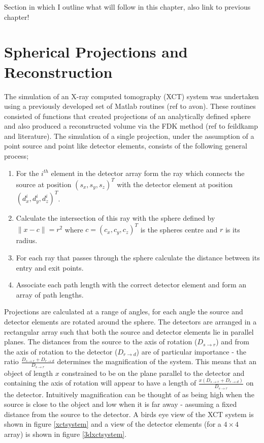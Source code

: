 \documentclass[
  twoside,
  11pt, a4paper,
  footinclude=true,
  headinclude=true,
  cleardoublepage=empty
]{scrbook}
\begin{document}
Section in which I outline what will follow in this chapter, also link to previous chapter!

\section{Spherical Projections and Reconstruction}

The simulation of an X-ray computed tomography (XCT) system was undertaken using a previously developed set of Matlab routines (ref to avon). These routines consisted of functions that created projections of an analytically defined sphere and also produced a reconstructed volume via the FDK method (ref to feildkamp and literature). The simulation of a single projection, under the assumption of a point source and point like detector elements, consists of the following general process;

\begin{enumerate}
\item For the $i^{th}$ element in the detector array form the ray which connects the source at position $(s_x,s_y,s_z)^T$ with the detector element at position $(d_x^i,d_y^i,d_z^i)^T$.
\item Calculate the intersection of this ray with the sphere defined by $\|x - c\| = r^2$ where $c = (c_x,c_y,c_z)^T$ is the spheres centre and $r$ is its radius.
\item For each ray that passes through the sphere calculate the distance between its entry and exit points.
\item Associate each path length with the correct detector element and form an array of path lengths.
\end{enumerate}

Projections are calculated at a range of angles, for each angle the source and detector elements are rotated around the sphere. The detectors are arranged in a rectangular array such that both the source and detector elements lie in parallel planes. The distances from the source to the axis of rotation ($D_{s\rightarrow r}$) and from the axis of rotation to the detector ($D_{r \rightarrow d}$) are of particular importance - the ratio $\frac{D_{s\rightarrow r}+D_{r \rightarrow d}}{D_{s\rightarrow r}}$ determines the magnification of the system. This means that an object of length $x$ constrained to be on the plane parallel to the detector and containing the axis of rotation will appear to have a length of $\frac{x(D_{s\rightarrow r}+D_{r \rightarrow d})}{D_{s\rightarrow r}}$ on the detector. Intuitively magnification can be thought of as being high when the source is close to the object and low when it is far away - assuming a fixed distance from the source to the detector. A birds eye view of the XCT system is shown in figure \ref{xctsystem} and a view of the detector elements (for a $4\times4$ array) is shown in figure \ref{3dxctsystem}.
\end{document}
